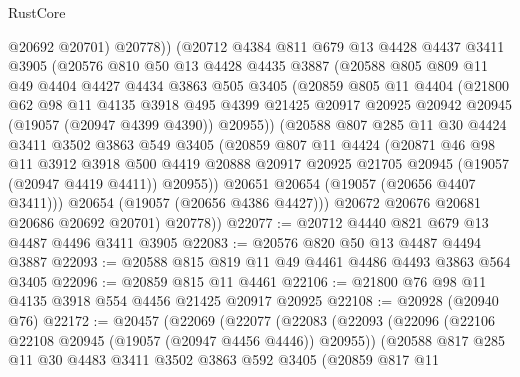 \begin{lexlean}{RustCore}
\begin{coremodule}
            @20692
            @20701)
          @20778))
      (@20712
        @4384
        @811
        @679
        @13
        @4428
        @4437
        @3411
        @3905
        (@20576
          @810
          @50
          @13
          @4428
          @4435
          @3887
          (@20588
            @805
            @809
            @11
            @49
            @4404
            @4427
            @4434
            @3863
            @505
            @3405
            (@20859
              @805
              @11
              @4404
              (@21800
                @62
                @98
                @11
                @4135
                @3918
                @495
                @4399
                @21425
                @20917
                @20925
                @20942
                @20945
                (@19057 (@20947 @4399 @4390))
                @20955))
            (@20588
              @807
              @285
              @11
              @30
              @4424
              @3411
              @3502
              @3863
              @549
              @3405
              (@20859
                @807
                @11
                @4424
                (@20871
                  @46
                  @98
                  @11
                  @3912
                  @3918
                  @500
                  @4419
                  @20888
                  @20917
                  @20925
                  @21705
                  @20945
                  (@19057 (@20947 @4419 @4411))
                  @20955))
              @20651
              @20654
              (@19057 (@20656 @4407 @3411)))
            @20654
            (@19057 (@20656 @4386 @4427)))
          @20672
          @20676
          @20681
          @20686
          @20692
          @20701)
        @20778))
@22077 := @20712 @4440 @821 @679 @13 @4487 @4496 @3411 @3905
@22083 := @20576 @820 @50 @13 @4487 @4494 @3887
@22093 := @20588 @815 @819 @11 @49 @4461 @4486 @4493 @3863 @564 @3405
@22096 := @20859 @815 @11 @4461
@22106 := @21800 @76 @98 @11 @4135 @3918 @554 @4456 @21425 @20917 @20925
@22108 := @20928 (@20940 @76)
@22172 := @20457
    (@22069
      (@22077
        (@22083
          (@22093
            (@22096 (@22106 @22108 @20945 (@19057 (@20947 @4456 @4446)) @20955))
            (@20588
              @817
              @285
              @11
              @30
              @4483
              @3411
              @3502
              @3863
              @592
              @3405
              (@20859
                @817
                @11

\end{coremodule}
\end{lexlean}
